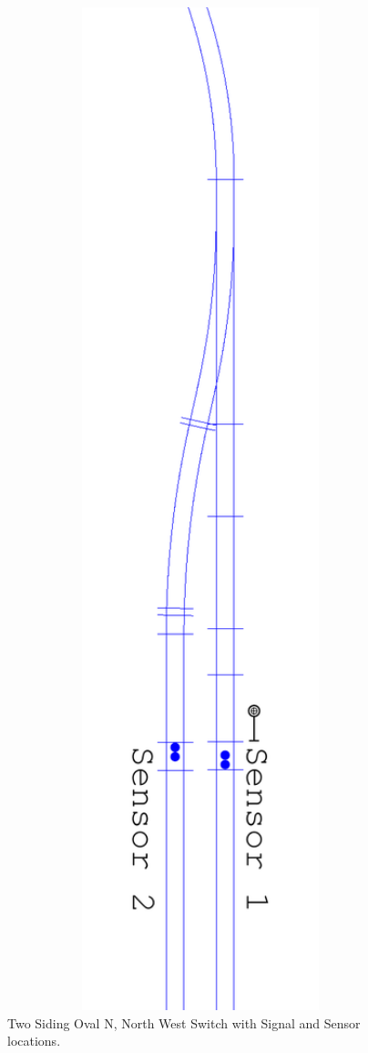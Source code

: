 \begin{figure}[hbpt]
\begin{centering}
\includegraphics[angle=90,width=5in]{TwoSidingOval-N-NW-Switch-sig-sensor.pdf}
\caption{Two Siding Oval N, North West Switch with Signal and Sensor locations.}
\label{fig:TheLayout:TwoSidingOval-N-NW-Switch-sig-sensor}
\end{centering}
\end{figure}
